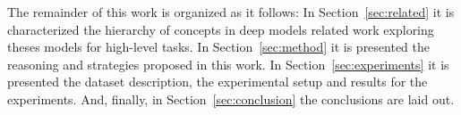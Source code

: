 The remainder of this work is organized as it follows:  In Section~\ref{sec:related} it is characterized the hierarchy of concepts in deep models related work exploring theses models for high-level tasks. In Section~\ref{sec:method} it is presented the reasoning and strategies proposed in this work. In Section~\ref{sec:experiments} it is presented the dataset description, the experimental setup and results for the experiments. And, finally, in Section~\ref{sec:conclusion} the conclusions are laid out.

